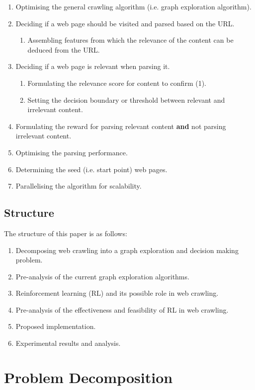 \documentclass{article}
\begin{document}
\begin{enumerate}
	\item Optimising the general crawling algorithm (i.e. graph exploration algorithm).
	\item Deciding if a web page should be visited and parsed based on the URL.
	\begin{enumerate}
		\item Assembling features from which the relevance of the content can be deduced from the URL.
	\end{enumerate}
	\item Deciding if a web page is relevant when parsing it.
	\begin{enumerate}
		\item Formulating the relevance score for content to confirm (1).
		\item Setting the decision boundary or threshold between relevant and irrelevant content.
	\end{enumerate}
	\item Formulating the reward for parsing relevant content \textbf{and} not parsing irrelevant content.
	\item Optimising the parsing performance.
	
	\item Determining the seed (i.e. start point) web pages.
	\item Parallelising the algorithm for scalability.
\end{enumerate}

\subsection{Structure} The structure of this paper is as follows:
\begin{enumerate}
	\item Decomposing web crawling into a graph exploration and decision making problem.
	\item Pre-analysis of the current graph exploration algorithms.
	\item Reinforcement learning (RL) and its possible role in web crawling.
	\item Pre-analysis of the effectiveness and feasibility of RL in web crawling.
	\item Proposed implementation.
	\item Experimental results and analysis.
\end{enumerate}
\newpage

\section{Problem Decomposition}
\label{sec:2}
\end{document}
